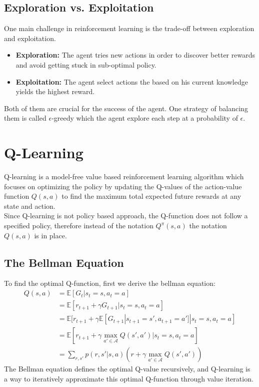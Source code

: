 \documentclass[12pt,a4paper]{report}
\begin{document}
\subsection{Exploration vs. Exploitation}
One main challenge in reinforcement learning is the trade-off between exploration and exploitation.
\begin{itemize}
    \item \textbf{Exploration:} The agent tries new actions in order to discover better rewards and avoid getting stuck in sub-optimal policy.
    \item \textbf{Exploitation:} The agent select actions the based on his current knowledge yields the highest reward.
\end{itemize}
Both of them are crucial for the success of the agent. One strategy of balancing them is called $\epsilon$-greedy which the agent explore each step at a probability of $\epsilon$.  
\section{Q-Learning}
Q-learning is a model-free value based reinforcement learning algorithm which focuses on optimizing the policy by updating the Q-values of the action-value function $Q(s,a)$ to find the maximum total expected future rewards at any state and action.\\
Since Q-learning is not policy based approach, the Q-function does not follow a specified policy, therefore instead of the notation $Q^{\pi}(s,a)$ the notation $Q(s,a)$ is in place.
\subsection{The Bellman Equation}
To find the optimal Q-function, first we derive the bellman equation: 
\begin{align*}
    Q(s,a) &= \mathbb{E}[G_t|s_t=s, a_t=a]\\
           &= \mathbb{E}[r_{t+1}+\gamma G_{t+1}|s_t=s, a_t=a]\\
           &= \mathbb{E}[r_{t+1}+\gamma\mathbb{E}[G_{t+1}|s_{t+1}=s',a_{t+1}=a']|s_t=s, a_t=a]\\
           &= \mathbb{E}[r_{t+1}+\gamma\max_{a'\in \mathcal{A}}Q(s',a')|s_t=s, a_t=a]\\
           &= \sum_{r,s'}p(r,s'|s,a)(r+\gamma\max_{a'\in \mathcal{A}}Q(s',a'))
\end{align*}
The Bellman equation defines the optimal Q-value recursively, and Q-learning is a way to iteratively approximate this optimal Q-function through value iteration.
\end{document}

